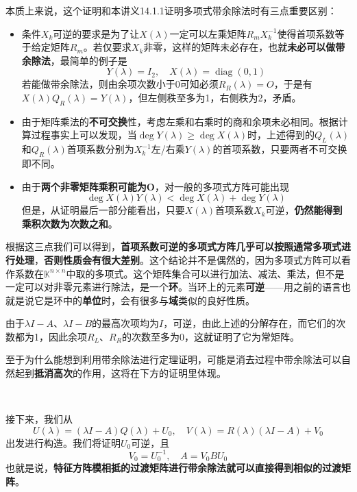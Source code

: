 \documentclass[a4paper,UTF8,fontset=windows,AutoFakeBold]{ctexart}
\DeclareMathOperator{\diag}{diag}
\newcommand*{\note}{\noindent *}
\begin{document}
\note 本质上来说，这个证明和本讲义14.1.1证明多项式带余除法时有三点重要区别：
\begin{itemize}
    \item 条件$X_k$可逆的要求是为了让$X(\lambda)$一定可以左乘矩阵$R_mX_k^{-1}$使得首项系数等于给定矩阵$R_m$。若仅要求$X_k$非零，这样的矩阵未必存在，也就\textbf{未必可以做带余除法}，最简单的例子是
    $$Y(\lambda)=I_2,\quad X(\lambda)=\diag(0,1)$$
    若能做带余除法，则由余项次数小于0可知必须$R_R(\lambda)=O$，于是有$X(\lambda)Q_R(\lambda)=Y(\lambda)$，但左侧秩至多为1，右侧秩为2，矛盾。
    \item 由于矩阵乘法的\textbf{不可交换}性，考虑左乘和右乘时的商和余项未必相同。根据计算过程事实上可以发现，当$\deg Y(\lambda)\ge\deg X(\lambda)$时，上述得到的$Q_L(\lambda)$和$Q_R(\lambda)$首项系数分别为$X_k^{-1}$左/右乘$Y(\lambda)$的首项系数，只要两者不可交换即不同。
    \item 由于\textbf{两个非零矩阵乘积可能为O}，对一般的多项式方阵可能出现
    $$\deg X(\lambda)Y(\lambda)<\deg X(\lambda)+\deg Y(\lambda)$$
    但是，从证明最后一部分能看出，只要$X(\lambda)$首项系数$X_k$可逆，\textbf{仍然能得到乘积次数为次数之和}。
\end{itemize}
根据这三点我们可以得到，\textbf{首项系数可逆的多项式方阵几乎可以按照通常多项式进行处理}，\textbf{否则性质会有很大差别}。这个结论并不是偶然的，因为多项式方阵可以看作系数在$\mathbb{K}^{n\times n}$中取的多项式。这个矩阵集合可以进行加法、减法、乘法，但不是一定可以对非零元素进行除法，是一个\textbf{环}。当环上的元素\textbf{可逆}——用之前的语言也就是说它是环中的\textbf{单位}时，会有很多与\textbf{域}类似的良好性质。

\note 由于$\lambda I-A$、$\lambda I-B$的最高次项均为$I$，可逆，由此上述的分解存在，而它们的次数都为1，因此余项$R_L$、$R_R$的次数至多为0，这就证明了它为常矩阵。

\note 至于为什么能想到利用带余除法进行定理证明，可能是消去过程中带余除法可以自然起到\textbf{抵消高次}的作用，这将在下方的证明里体现。

\

接下来，我们从
$$U(\lambda)=(\lambda I-A)Q(\lambda)+U_0,\quad V(\lambda)=R(\lambda)(\lambda I-A)+V_0$$
出发进行构造。我们将证明$U_0$可逆，且
$$V_0=U_0^{-1},\quad A=V_0BU_0$$
也就是说，\textbf{特征方阵模相抵的过渡矩阵进行带余除法就可以直接得到相似的过渡矩阵}。
\end{document}
